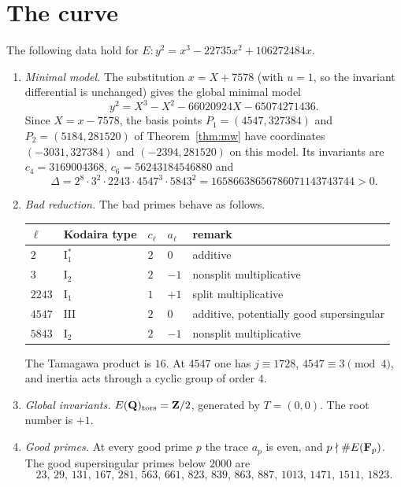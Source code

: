 \section{The curve}\label{sec:curve}

\begin{proposition}\label{prop:curve}
The following data hold for $E\colon y^2=x^3-22735x^2+106272484x$.
\begin{enumerate}[label=(\roman*)]
\item \emph{Minimal model.} The substitution $x=X+7578$ (with $u=1$, so the invariant differential is unchanged) gives the global minimal model
\[
y^2=X^3-X^2-66020924X-65074271436 .
\]
Since $X=x-7578$, the basis points $P_1=(4547,327384)$ and $P_2=(5184,281520)$ of Theorem~\ref{thm:mw} have coordinates $(-3031,327384)$ and $(-2394,281520)$ on this model. Its invariants are $c_4=3169004368$, $c_6=56243184546880$ and
\[
\Delta=2^8\cdot3^2\cdot2243\cdot4547^3\cdot5843^2=16586638656786071143743744>0 .
\]
\item \emph{Bad reduction.} The bad primes behave as follows.
\begin{center}
\begin{tabular}{@{}lllll@{}}
\toprule
$\ell$ & Kodaira type & $c_\ell$ & $a_\ell$ & remark\\ \midrule
$2$ & $\mathrm{I}_1^*$ & $2$ & $0$ & additive\\
$3$ & $\mathrm{I}_2$ & $2$ & $-1$ & nonsplit multiplicative\\
$2243$ & $\mathrm{I}_1$ & $1$ & $+1$ & split multiplicative\\
$4547$ & $\mathrm{III}$ & $2$ & $0$ & additive, potentially good supersingular\\
$5843$ & $\mathrm{I}_2$ & $2$ & $-1$ & nonsplit multiplicative\\ \bottomrule
\end{tabular}
\end{center}
The Tamagawa product is $16$. At $4547$ one has $j\equiv1728$, $4547\equiv3\pmod 4$, and inertia acts through a cyclic group of order $4$.
\item \emph{Global invariants.} $E(\mathbf{Q})_{\mathrm{tors}}=\mathbf{Z}/2$, generated by $T=(0,0)$. The root number is $+1$.
\item \emph{Good primes.} At every good prime $p$ the trace $a_p$ is even, and $p\nmid\#E(\mathbf{F}_p)$. The good supersingular primes below $2000$ are
\[
23,\,29,\,131,\,167,\,281,\,563,\,661,\,823,\,839,\,863,\,887,\,1013,\,1471,\,1511,\,1823 .
\]
\end{enumerate}
\end{proposition}

